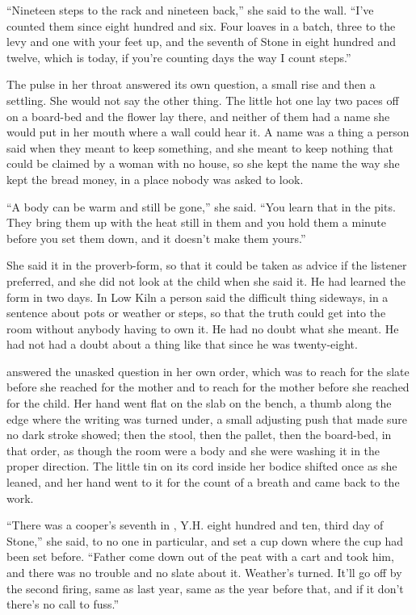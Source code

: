 “Nineteen steps to the rack and nineteen back,” she said to the wall. “I've counted them since eight hundred and six. Four loaves in a batch, three to the levy and one with your feet up, and the seventh of Stone in eight hundred and twelve, which is today, if you're counting days the way I count steps.”

The pulse in her throat answered its own question, a small rise and then a settling. She would not say the other thing. The little hot one lay two paces off on a board-bed and the flower lay there, and neither of them had a name she would put in her mouth where a wall could hear it. A name was a thing a person said when they meant to keep something, and she meant to keep nothing that could be claimed by a woman with no house, so she kept the name the way she kept the bread money, in a place nobody was asked to look.

“A body can be warm and still be gone,” she said. “You learn that in the pits. They bring them up with the heat still in them and you hold them a minute before you set them down, and it doesn't make them yours.”

She said it in the proverb-form, so that it could be taken as advice if the listener preferred, and she did not look at the child when she said it. He had learned the form in two days. In Low Kiln a person said the difficult thing sideways, in a sentence about pots or weather or steps, so that the truth could get into the room without anybody having to own it. He had no doubt what she meant. He had not had a doubt about a thing like that since he was twenty-eight.

\scenebreak

 answered the unasked question in her own order, which was to reach for the slate before she reached for the mother and to reach for the mother before she reached for the child. Her hand went flat on the slab on the bench, a thumb along the edge where the writing was turned under, a small adjusting push that made sure no dark stroke showed; then the stool, then the pallet, then the board-bed, in that order, as though the room were a body and she were washing it in the proper direction. The little tin on its cord inside her bodice shifted once as she leaned, and her hand went to it for the count of a breath and came back to the work.

“There was a cooper's seventh in , Y.H. eight hundred and ten, third day of Stone,” she said, to no one in particular, and set a cup down where the cup had been set before. “Father come down out of the peat with a cart and took him, and there was no trouble and no slate about it. Weather's turned. It'll go off by the second firing, same as last year, same as the year before that, and if it don't there's no call to fuss.”


